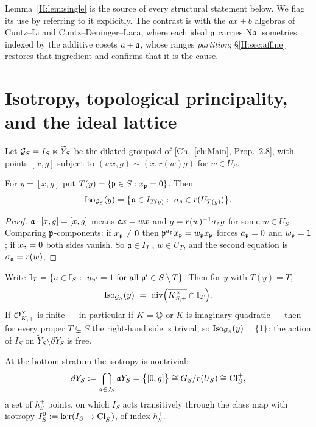 Lemma~\ref{II:lem:single} is the source of every structural statement below. We flag its use
by referring to it explicitly. The contrast is with the $ax+b$ algebras of Cuntz--Li and
Cuntz--Deninger--Laca, where each ideal $\mathfrak{a}$ carries $\mathrm{N}\mathfrak{a}$ isometries indexed by the
additive cosets $a+\mathfrak{a}$, whose ranges \emph{partition}; \S\ref{II:sec:affine} restores that
ingredient and confirms that it is the cause.

\section{Isotropy, topological principality, and the ideal lattice}

Let $\mathcal{G}_S=I_S\ltimes\widetilde Y_S$ be the dilated groupoid of [Ch.~\ref{ch:Main}, Prop.~2.8],
with points $[x,g]$ subject to $(wx,g)\sim(x,r(w)g)$ for $w\in U_S$.

\begin{lemma}\label{II:lem:iso}
For $y=[x,g]$ put $T(y)=\{\mathfrak{p}\in S:x_{\mathfrak{p}}=0\}$. Then
\begin{equation}\label{II:eq:iso}
\operatorname{Iso}_{\mathcal{G}_S}(y)=\bigl\{\mathfrak{a}\in I_{T(y)}:\ \sigma_{\mathfrak{a}}\in r(U_{T(y)})\bigr\}.
\end{equation}
\end{lemma}

\begin{proof}
$\mathfrak{a}\cdot[x,g]=[x,g]$ means $\mathfrak{a} x=wx$ and $g=r(w)^{-1}\sigma_{\mathfrak{a}} g$ for some $w\in U_S$.
Comparing $\mathfrak{p}$-components: if $x_{\mathfrak{p}}\ne0$ then $\mathfrak{p}^{a_{\mathfrak{p}}}x_{\mathfrak{p}}=w_{\mathfrak{p}} x_{\mathfrak{p}}$ forces
$a_{\mathfrak{p}}=0$ and $w_{\mathfrak{p}}=1$; if $x_{\mathfrak{p}}=0$ both sides vanish. So $\mathfrak{a}\in I_T$, $w\in U_T$, and
the second equation is $\sigma_{\mathfrak{a}}=r(w)$.
\end{proof}

\begin{proposition}\label{II:prop:nojump}
Write $\mathbb{I}_T=\{u\in\mathbb{I}_S:\ u_{\mathfrak{p}'}=1\ \text{for all }\mathfrak{p}'\in S\setminus T\}$. Then for
$y$ with $T(y)=T$,
\begin{equation}\label{II:eq:isodiv}
\Iso_{\cG_S}(y)\ =\ \mathrm{div}\Bigl(\overline{K^\times_{S,+}}\cap\Idl_T\Bigr).
\end{equation}
If $\mathcal{O}^\times_{K,+}$ is finite --- in particular if $K=\mathbb{Q}$ or $K$ is imaginary quadratic
--- then for every proper $T\subsetneq S$ the right-hand side is trivial, so
$\operatorname{Iso}_{\mathcal{G}_S}(y)=\{1\}$: the action of $I_S$ on $\widetilde Y_S\setminus\partial Y_S$ is free.

At the bottom stratum the isotropy is nontrivial:
\[
\partial Y_S:=\bigcap_{\mathfrak{a}\in J_S}\mathfrak{a} Y_S=\bigl\{[0,g]\bigr\}\cong G_S/r(U_S)\cong\operatorname{Cl}^+_S,
\]
a set of $h^+_S$ points, on which $I_S$ acts transitively through the class map with
isotropy $I_S^0:=\ker(I_S\to\operatorname{Cl}^+_S)$, of index $h^+_S$.
\end{proposition}

